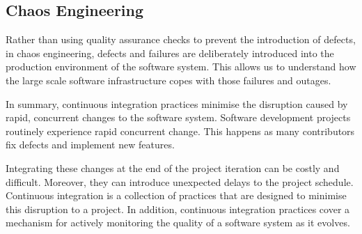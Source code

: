 \documentclass[a4paper, openany]{memoir}
\begin{document}
\subsection{Chaos Engineering}
Rather than using quality assurance checks to prevent the introduction of defects, in chaos engineering, defects and failures are deliberately introduced into the production environment of the software system. This allows us to understand how the large scale software infrastructure copes with those failures and outages.

In summary, continuous integration practices minimise the disruption caused by rapid, concurrent changes to the software system. Software development projects routinely experience rapid concurrent change. This happens as many contributors fix defects and implement new features.

Integrating these changes at the end of the project iteration can be costly and difficult. Moreover, they can introduce unexpected delays to the project schedule. Continuous integration is a collection of practices that are designed to minimise this disruption to a project. In addition, continuous integration practices cover a mechanism for actively monitoring the quality of a software system as it evolves.
\end{document}
